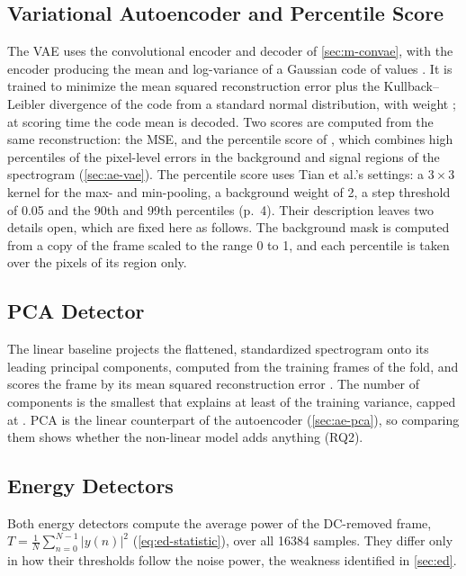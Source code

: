 \subsection{Variational Autoencoder and Percentile Score}
\label{sec:m-vae}

The VAE uses the convolutional encoder and decoder of \cref{sec:m-convae}, with the encoder producing the mean and log-variance of a Gaussian code of  values \parencite{kingma2014}. It is trained to minimize the mean squared reconstruction error plus the Kullback--Leibler divergence of the code from a standard normal distribution, with weight ; at scoring time the code mean is decoded. Two scores are computed from the same reconstruction: the MSE, and the percentile score of \textcite{tian2022}, which combines high percentiles of the pixel-level errors in the background and signal regions of the spectrogram (\cref{sec:ae-vae}). The percentile score uses Tian et al.'s settings: a $3 \times 3$ kernel for the max- and min-pooling, a background weight of 2, a step threshold of 0.05 and the 90th and 99th percentiles (p.~4). Their description leaves two details open, which are fixed here as follows. The background mask is computed from a copy of the frame scaled to the range 0 to 1, and each percentile is taken over the pixels of its region only.

\subsection{PCA Detector}
\label{sec:m-pca}

The linear baseline projects the flattened, standardized spectrogram onto its leading principal components, computed from the training frames of the fold, and scores the frame by its mean squared reconstruction error \parencite{ruff2021}. The number of components is the smallest that explains at least  of the training variance, capped at . PCA is the linear counterpart of the autoencoder (\cref{sec:ae-pca}), so comparing them shows whether the non-linear model adds anything (RQ2).

\subsection{Energy Detectors}
\label{sec:m-ed}

Both energy detectors compute the average power of the DC-removed frame, $T = \frac{1}{N}\sum_{n=0}^{N-1} \lvert y(n) \rvert^2$ (\cref{eq:ed-statistic}), over all \num{16384} samples. They differ only in how their thresholds follow the noise power, the weakness identified in \cref{sec:ed}.

